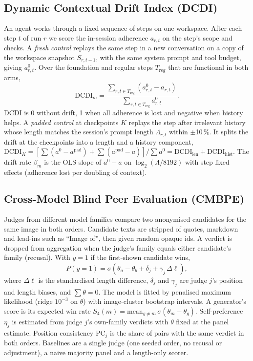 \documentclass[conference]{IEEEtran}
\begin{document}
\subsection{Dynamic Contextual Drift Index (DCDI)}
An agent works through a fixed sequence of steps on one workspace. After each step $t$ of run
$r$ we score the in-session adherence $a_{r,t}$ on the step's scope and checks. A \emph{fresh
control} replays the same step in a new conversation on a copy of the workspace snapshot
$S_{r,t-1}$, with the same system prompt and tool budget, giving $a^0_{r,t}$. Over the
foundation and regular steps $T_\text{reg}$ that are functional in both arms,
\begin{equation}
\mathrm{DCDI}_m = \frac{\sum_{r,t\in T_\text{reg}} (a^0_{r,t} - a_{r,t})}{\sum_{r,t\in T_\text{reg}} a^0_{r,t}} .
\end{equation}
DCDI is 0 without drift, 1 when all adherence is lost and negative when history helps. A
\emph{padded control} at checkpoints $K$ replays the step after irrelevant history whose
length matches the session's prompt length $\Lambda_{r,t}$ within $\pm$10\,\%. It splits the
drift at the checkpoints into a length and a history component,
$\mathrm{DCDI}_K = [\sum (a^0 - a^\text{pad}) + \sum (a^\text{pad} - a)] / \sum a^0 =
\mathrm{DCDI}_\text{len} + \mathrm{DCDI}_\text{hist}$. The drift rate $\beta_m$ is the OLS
slope of $a^0-a$ on $\log_2(\Lambda/8192)$ with step fixed effects (adherence lost per
doubling of context).

\subsection{Cross-Model Blind Peer Evaluation (CMBPE)}
Judges from different model families compare two anonymised candidates for the same image in
both orders. Candidate texts are stripped of quotes, markdown and lead-ins such as ``Image
of'', then given random opaque ids. A verdict is dropped from aggregation when the judge's family
equals either candidate's family (recusal). With $y=1$ if the first-shown candidate wins,
\begin{equation}
P(y=1) = \sigma(\theta_a - \theta_b + \delta_j + \gamma_j\,\Delta\ell),
\end{equation}
where $\Delta\ell$ is the standardised length difference, $\delta_j$ and $\gamma_j$ are judge
$j$'s position and length biases, and $\sum\theta = 0$. The model is fitted by penalised
maximum likelihood (ridge $10^{-3}$ on $\theta$) with image-cluster bootstrap intervals.
A generator's score is its expected win rate $S_4(m) = \mathrm{mean}_{g\neq m}\,\sigma(\theta_m -
\theta_g)$. Self-preference $\eta_j$ is estimated from judge $j$'s own-family verdicts with
$\theta$ fixed at the panel estimate. Position consistency $\mathrm{PC}_j$ is the share of
pairs with the same verdict in both orders. Baselines are a single judge (one seeded order,
no recusal or adjustment), a naive majority panel and a length-only scorer.
\end{document}
